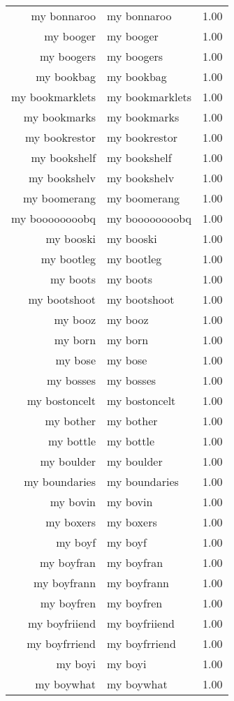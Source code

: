 \begin{table}[ht]
\begin{tabular}{rlr}
  my bonnaroo & my bonnaroo & 1.00 \\ 
  my booger & my booger & 1.00 \\ 
  my boogers & my boogers & 1.00 \\ 
  my bookbag & my bookbag & 1.00 \\ 
  my bookmarklets & my bookmarklets & 1.00 \\ 
  my bookmarks & my bookmarks & 1.00 \\ 
  my bookrestor & my bookrestor & 1.00 \\ 
  my bookshelf & my bookshelf & 1.00 \\ 
  my bookshelv & my bookshelv & 1.00 \\ 
  my boomerang & my boomerang & 1.00 \\ 
  my boooooooobq & my boooooooobq & 1.00 \\ 
  my booski & my booski & 1.00 \\ 
  my bootleg & my bootleg & 1.00 \\ 
  my boots & my boots & 1.00 \\ 
  my bootshoot & my bootshoot & 1.00 \\ 
  my booz & my booz & 1.00 \\ 
  my born & my born & 1.00 \\ 
  my bose & my bose & 1.00 \\ 
  my bosses & my bosses & 1.00 \\ 
  my bostoncelt & my bostoncelt & 1.00 \\ 
  my bother & my bother & 1.00 \\ 
  my bottle & my bottle & 1.00 \\ 
  my boulder & my boulder & 1.00 \\ 
  my boundaries & my boundaries & 1.00 \\ 
  my bovin & my bovin & 1.00 \\ 
  my boxers & my boxers & 1.00 \\ 
  my boyf & my boyf & 1.00 \\ 
  my boyfran & my boyfran & 1.00 \\ 
  my boyfrann & my boyfrann & 1.00 \\ 
  my boyfren & my boyfren & 1.00 \\ 
  my boyfriiend & my boyfriiend & 1.00 \\ 
  my boyfrriend & my boyfrriend & 1.00 \\ 
  my boyi & my boyi & 1.00 \\ 
  my boywhat & my boywhat & 1.00 \\ 

\end{tabular}
\end{table}
